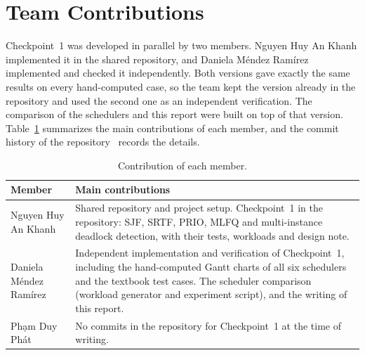 \section*{Team Contributions}
Checkpoint~1 was developed in parallel by two members. Nguyen Huy An Khanh implemented it in the shared repository, and Daniela Méndez Ramírez implemented and checked it independently. Both versions gave exactly the same results on every hand-computed case, so the team kept the version already in the repository and used the second one as an independent verification. The comparison of the schedulers and this report were built on top of that version. Table~\ref{tab:contributions} summarizes the main contributions of each member, and the commit history of the repository~\cite{repo} records the details.

\begin{table}[H]
\centering
\caption{Contribution of each member.}
\label{tab:contributions}
\begin{tabular}{p{}p{}}
\toprule
Member & Main contributions \\
\midrule
Nguyen Huy An Khanh & Shared repository and project setup. Checkpoint~1 in the repository: SJF, SRTF, PRIO, MLFQ and multi-instance deadlock detection, with their tests, workloads and design note. \\
\addlinespace
Daniela Méndez Ramírez & Independent implementation and verification of Checkpoint~1, including the hand-computed Gantt charts of all six schedulers and the textbook test cases. The scheduler comparison (workload generator and experiment script), and the writing of this report. \\
\addlinespace
Ph\d{a}m Duy Ph\'{a}t & No commits in the repository for Checkpoint~1 at the time of writing. \\
\bottomrule
\end{tabular}
\end{table}


